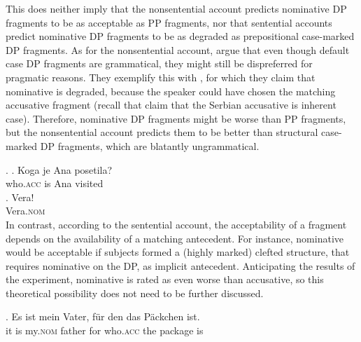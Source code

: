This does neither imply that the nonsentential account predicts nominative DP fragments to be as acceptable as PP fragments, nor that sentential accounts predict nominative DP fragments to be as degraded as prepositional case-marked DP fragments. As for the nonsentential account, \citet{progovac.etal2006} argue that even though default case DP fragments are grammatical, they might still be dispreferred for pragmatic reasons. They exemplify this with  \Next, for which they claim that nominative is degraded, because the speaker could have chosen the matching accusative fragment (recall that \citet{progovac.etal2006} claim that the Serbian accusative is inherent case). Therefore, nominative DP fragments might be worse than PP fragments, but the nonsentential account predicts them to be better than structural case-marked DP fragments, which are blatantly ungrammatical.

\ex. \ag. Koga je Ana posetila?\\
who.\textsc{acc} is Ana visited \\
\bg. Vera!\\
Vera.\textsc{nom}\\

In contrast, according to the sentential account, the acceptability of a fragment depends on the availability of a matching antecedent. For instance, nominative would be acceptable if subjects formed a (highly marked) clefted structure, that requires nominative on the DP, as implicit antecedent. Anticipating the results of the experiment,  nominative is rated as even worse than accusative, so this theoretical possibility does not need to be further discussed.

\exg. Es ist mein Vater, für den das Päckchen ist.\\
      it is my.\textsc{nom} father for who.\textsc{acc} the package is\\

